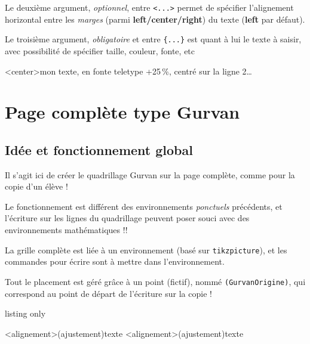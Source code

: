\documentclass[a4paper]{article}
\newcommand\Cle[1]{{\bfseries\sffamily\textlangle #1\textrangle}}
\begin{document}
Le deuxième argument, \textit{optionnel}, entre \texttt{<...>} permet de spécifier l'alignement horizontal entre les \textit{marges} (parmi \Cle{left/center/right}) du texte (\Cle{left} par défaut).

\medskip

Le troisième argument, \textit{obligatoire} et entre \texttt{\{...\}} est quant à lui le texte à saisir, avec possibilité de spécifier taille, couleur, fonte, etc

\begin{PresentationCode}{}
\begin{EnvGurvan}[Marge=1,Interligne=2,NbCarreaux=17x4]
	\EcrireLigneGurvan[Echelle=1.25]<center>{\ttfamily mon texte, en fonte teletype +25\,\%, centré sur la ligne 2\ldots}
\end{EnvGurvan}
\end{PresentationCode}
\pagebreak

\section{Page complète type Gurvan}

\subsection{Idée et fonctionnement global}

Il s'agit ici de créer le quadrillage Gurvan sur la page complète, comme pour la copie d'un élève !

\smallskip

\faBomb{} Le fonctionnement est différent des environnements \textit{ponctuels} précédents, et l'écriture sur les lignes du quadrillage peuvent poser souci avec des environnements mathématiques !!

\medskip

La grille complète est liée à un environnement (basé sur \texttt{tikzpicture}), et les commandes pour écrire sont à mettre dans l'environnement.

\smallskip

Tout le placement est géré grâce à un point (fictif), nommé \texttt{(GurvanOrigine)}, qui correspond au point de départ de l'écriture sur la copie !
%
\begin{PresentationCode}{listing only}
\begin{PleinePageGurvan}[options]
	\LigneGurvan[options]<alignement>(ajustement){texte}
	\ParagrapheGurvan[options]<alignement>(ajustement){texte}
\end{PleinePageGurvan}
\end{PresentationCode}
\end{document}
